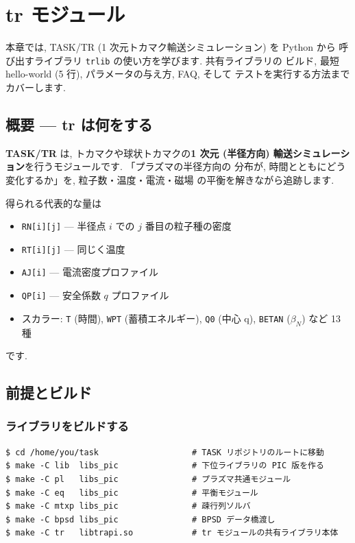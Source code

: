 \documentclass[11pt,a4paper]{report}
\begin{document}
\chapter{tr モジュール}
\label{ch:tr}

\begin{learn}
本章では, TASK/TR (1 次元トカマク輸送シミュレーション) を Python から
呼び出すライブラリ \texttt{trlib} の使い方を学びます. 共有ライブラリの
ビルド, 最短 hello-world (5 行), パラメータの与え方, FAQ, そして
テストを実行する方法までカバーします.
\end{learn}

\section{概要 — tr は何をする}

\textbf{TASK/TR} は, トカマクや球状トカマクの\textbf{1 次元 (半径方向)
輸送シミュレーション}を行うモジュールです. 「プラズマの半径方向の
分布が, 時間とともにどう変化するか」を, 粒子数・温度・電流・磁場
の平衡を解きながら追跡します.

得られる代表的な量は

\begin{itemize}[leftmargin=1.5em]
  \item \texttt{RN[i][j]} — 半径点 \(i\) での \(j\) 番目の粒子種の密度
  \item \texttt{RT[i][j]} — 同じく温度
  \item \texttt{AJ[i]}    — 電流密度プロファイル
  \item \texttt{QP[i]}    — 安全係数 \(q\) プロファイル
  \item スカラー: \texttt{T} (時間), \texttt{WPT} (蓄積エネルギー),
        \texttt{Q0} (中心 q), \texttt{BETAN} (\(\beta_N\)) など 13 種
\end{itemize}

です.

\section{前提とビルド}

\subsection{ライブラリをビルドする}

\begin{lstlisting}[style=bash,caption={tr モジュールのライブラリビルド}]
$ cd /home/you/task                   # TASK リポジトリのルートに移動
$ make -C lib  libs_pic               # 下位ライブラリの PIC 版を作る
$ make -C pl   libs_pic               # プラズマ共通モジュール
$ make -C eq   libs_pic               # 平衡モジュール
$ make -C mtxp libs_pic               # 疎行列ソルバ
$ make -C bpsd libs_pic               # BPSD データ橋渡し
$ make -C tr   libtrapi.so            # tr モジュールの共有ライブラリ本体
\end{lstlisting}
\end{document}
